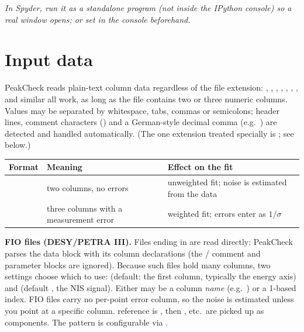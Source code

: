 \documentclass[11pt,a4paper]{article}
\begin{document}
\noindent\textit{In Spyder, run it as a standalone program (not inside the
IPython console) so a real window opens; or set  in the
console beforehand.}

\section{Input data}
PeakCheck reads plain-text column data regardless of the file extension:
, , , , , ,
,  and similar all work, as long as the file contains two
or three numeric columns. Values may be separated by whitespace, tabs, commas or
semicolons; header lines, comment characters (\code{# ! \%}) and a German-style
decimal comma (e.g.\ ) are detected and handled automatically. (The
one extension treated specially is ; see below.)

\begin{table}[h]\small\centering
\begin{tabularx}{\linewidth}{@{}l l L@{}}
\toprule
\textbf{Format} & \textbf{Meaning} & \textbf{Effect on the fit}\\
\midrule
{} & two columns, no errors & unweighted fit; noise is estimated from the data\\
 & three columns with a measurement error & weighted fit; errors enter as $1/\sigma$\\
\bottomrule
\end{tabularx}
\end{table}

\noindent\textbf{FIO files (DESY/PETRA III).} Files ending in  are read
directly: PeakCheck parses the  data block with its  column
declarations (the / comment and parameter blocks are ignored).
Because such files hold many columns, two settings choose which to use:
 (default: the first column, typically the energy axis) and
 (default , the NIS signal). Either may be a column
\emph{name} (e.g.\ ) or a 1-based index. FIO files carry no
per-point error column, so the noise is estimated unless you point
 at a specific column.
reference is , then , 
etc.\ are picked up as components. The pattern is configurable via
.
\end{document}
